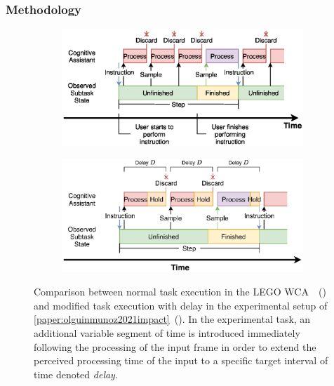\subsubsection{Methodology}

\begin{figure}[tb]
    \centering
    \begin{subfigure}[t]{.45\textwidth}
        \centering
        \includegraphics[width=\textwidth]{publications/2021ImpactDelayedResponse/Fig4a}
        \caption{}\label{sfig:regularwcaexec}
    \end{subfigure}%
    \hfill%
    \begin{subfigure}[t]{.45\textwidth}
        \centering
        \includegraphics[width=\textwidth]{publications/2021ImpactDelayedResponse/Fig4b}
        \caption{}\label{sfig:delaywcaexec}
    \end{subfigure}
    \caption{%
        Comparison between normal task execution in the LEGO \gls{WCA}~\cite{chen2015early}~() and modified task execution with delay in the experimental setup of \cref{paper:olguinmunoz2021impact}~().
        In the experimental task, an additional variable segment of time is introduced immediately following the processing of the input frame in order to extend the perceived processing time of the input to a specific target interval of time denoted \emph{delay}.
    }\label{fig:regularwca-vs-delaywca}
\end{figure}

